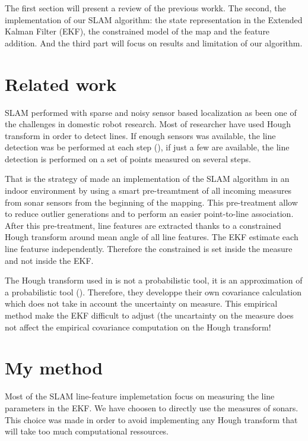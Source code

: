 \documentclass[a4paper,12pt]{article}
\begin{document}
The first section will present a review of the previous workk. The second, the implementation of our SLAM algorithm: the state representation in the Extended Kalman Filter (EKF), the constrained model of the map and the feature addition. And the third part will focus on results and limitation of our algorithm.

\section{Related work}
\label{sec:relwork}

SLAM performed with sparse and noisy sensor based localization as been one of the challenges in domestic robot research. 
Most of researcher have used Hough transform in order to detect lines. If enough sensors was available, the line detection was be performed at each step (\cite{grossmann2001robust}), if just a few are available, the line detection is performed on a set of points measured on several steps.

That is the strategy of \cite{choi2008line} made an implementation of the SLAM algorithm in an indoor environment by using a smart pre-treamtment of all incoming measures from sonar sensors from the beginning of the mapping. This pre-treatment allow to reduce outlier generations and to perform an easier point-to-line association.
After this pre-treatment, line features are extracted thanks to a constrained Hough transform around mean angle of all line features. The EKF estimate each line featurse independently.
Therefore the constrained is set inside the measure and not inside the EKF.

The Hough transform used in \cite{choi2008line} is not a probabilistic tool, it is an approximation of a probabilistic tool (\cite{stephens1991probabilistic}).
Therefore, they developpe their own covariance calculation which does not take in account the uncertainty on measure.
This empirical method make the EKF difficult to adjust (the uncartainty on the measure does not affect the empirical covariance computation on the Hough transform!



\section{My method}
\label{sec:method}

Most of the SLAM line-feature implemetation focus on measuring the line parameters  in the EKF. We have choosen to directly use the measures of sonars.
This choice was made in order to avoid implementing any Hough transform that will take too much computational ressources.
\end{document}
